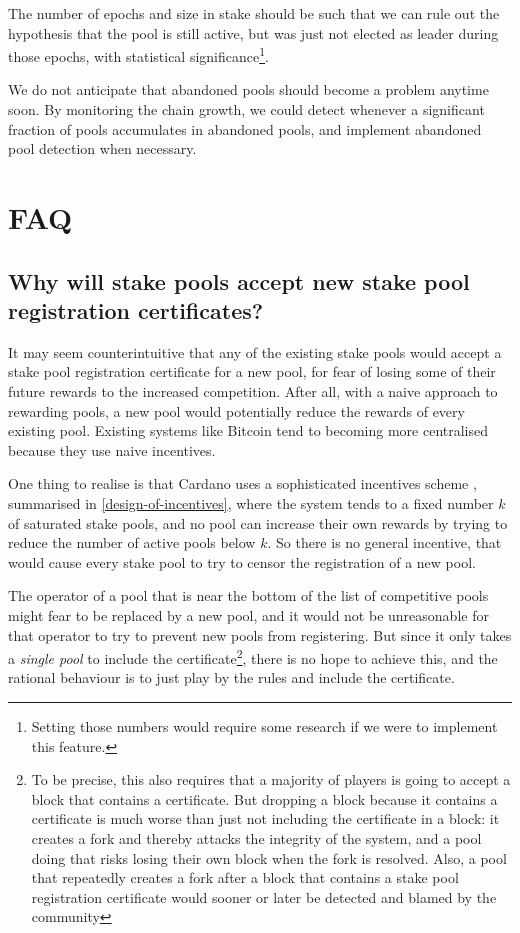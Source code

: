\documentclass[11pt,a4paper]{article}
\begin{document}
The number of epochs and size in stake should be such that we can rule out the
hypothesis that the pool is still active, but was just not elected as leader
during those epochs, with statistical significance\footnote{Setting those
  numbers would require some research if we were to implement this feature.}.

We do not anticipate that abandoned pools should become a problem anytime soon.
By monitoring the chain growth, we could detect whenever a significant fraction
of pools accumulates in abandoned pools, and implement abandoned pool detection
when necessary.

\section{FAQ}

\subsection{Why will stake pools accept new stake pool registration
  certificates?}

It may seem counterintuitive that any of the existing stake pools would accept a
stake pool registration certificate for a new pool, for fear of losing some of
their future rewards to the increased competition. After all, with a naive
approach to rewarding pools, a new pool would potentially reduce the rewards of
every existing pool. Existing systems like Bitcoin tend to becoming more
centralised because they use naive incentives.

One thing to realise is that Cardano uses a sophisticated incentives scheme
\citep{bkks2018}, summarised in \cref{design-of-incentives}, where the system
tends to a fixed number \(k\) of saturated stake pools, and no pool can increase
their own rewards by trying to reduce the number of active pools below \(k\). So
there is no general incentive, that would cause every stake pool to try to
censor the registration of a new pool.

The operator of a pool that is near the bottom of the list of competitive pools
might fear to be replaced by a new pool, and it would not be unreasonable for
that operator to try to prevent new pools from registering. But since it only
takes a \emph{single pool} to include the certificate\footnote{%
  To be precise, this also requires that a majority of players is going to
  accept a block that contains a certificate. But dropping a block because it
  contains a certificate is much worse than just not including the certificate
  in a block: it creates a fork and thereby attacks the integrity of the system,
  and a pool doing that risks losing their own block when the fork is resolved.
  Also, a pool that repeatedly creates a fork after a block that contains a
  stake pool registration certificate would sooner or later be detected and
  blamed by the community},%
there is no hope to achieve this, and the rational behaviour is to just play by
the rules and include the certificate.
\end{document}
